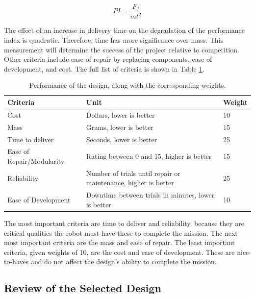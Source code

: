 \documentclass[ece]{uw-wkrpt}
\begin{document}
\[PI = \frac{F_f}{mt^2}\]

The effect of an increase in delivery time on the degradation of the performance index is quadratic. Therefore, time has more significance over mass. This measurement will determine the success of the project relative to competition. Other criteria include ease of repair by replacing components, ease of development, and cost. The full list of criteria is shown in Table \ref{tab:designSelection}. 


\begin{table}[]
\centering
\caption[Performance of the design, along with the corresponding weights]
{Performance of the design, along with the corresponding weights.}
\begin{tabular}{ | l | p{4in} | l |}
\hline
Criteria & Unit & Weight \\ \hline
Cost & Dollars, lower is better & 10 \\ \hline
Mass & Grams, lower is better & 15 \\ \hline
Time to deliver & Seconds, lower is better & 25 \\ \hline
Ease of Repair/Modularity & Rating between 0 and 15, higher is better & 15 \\ \hline
Reliability & Number of trials until repair or maintenance, higher is better & 25 \\ \hline
Ease of Development & Downtime between trials in minutes, lower is better & 10 \\ \hline
\end{tabular}
\label{tab:designSelection}
\end{table}


The most important criteria are time to deliver and reliability, because they are critical qualities the robot must have these to complete the mission. The next most important criteria are the mass and ease of repair. The least important criteria, given weights of 10, are the cost and ease of development. These are nice-to-haves and do not affect the design’s ability to complete the mission.

\subsection{Review of the Selected Design}
\end{document}
